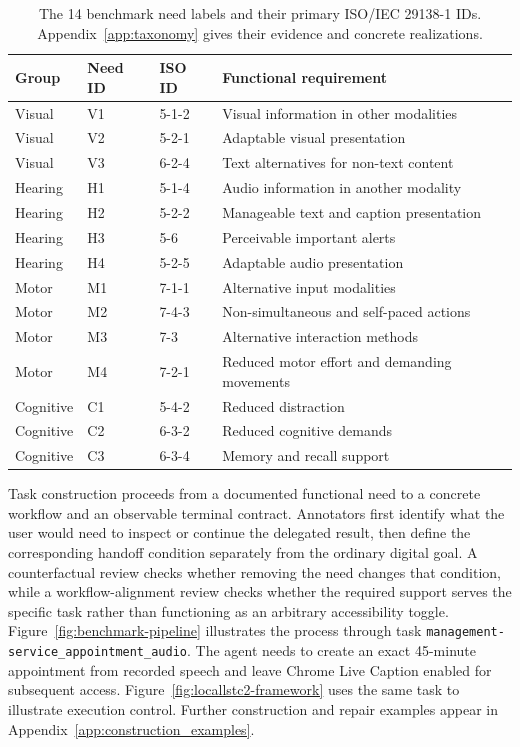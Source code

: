 \documentclass[11pt]{article}
\begin{document}
\begin{table}[t]
\centering
\small
\begin{tabular}{llll}
\toprule
Group & Need ID & ISO ID & Functional requirement \\
\midrule
Visual & V1 & 5-1-2 & Visual information in other modalities \\
Visual & V2 & 5-2-1 & Adaptable visual presentation \\
Visual & V3 & 6-2-4 & Text alternatives for non-text content \\
Hearing & H1 & 5-1-4 & Audio information in another modality \\
Hearing & H2 & 5-2-2 & Manageable text and caption presentation \\
Hearing & H3 & 5-6 & Perceivable important alerts \\
Hearing & H4 & 5-2-5 & Adaptable audio presentation \\
Motor & M1 & 7-1-1 & Alternative input modalities \\
Motor & M2 & 7-4-3 & Non-simultaneous and self-paced actions \\
Motor & M3 & 7-3 & Alternative interaction methods \\
Motor & M4 & 7-2-1 & Reduced motor effort and demanding movements \\
Cognitive & C1 & 5-4-2 & Reduced distraction \\
Cognitive & C2 & 6-3-2 & Reduced cognitive demands \\
Cognitive & C3 & 6-3-4 & Memory and recall support \\
\bottomrule
\end{tabular}
\caption{The 14 benchmark need labels and their primary ISO/IEC 29138-1 IDs. Appendix~\ref{app:taxonomy} gives their evidence and concrete realizations.}
\label{tab:method-needs}
\end{table}

Task construction proceeds from a documented functional need to a concrete workflow and an observable terminal contract. Annotators first identify what the user would need to inspect or continue the delegated result, then define the corresponding handoff condition separately from the ordinary digital goal. A counterfactual review checks whether removing the need changes that condition, while a workflow-alignment review checks whether the required support serves the specific task rather than functioning as an arbitrary accessibility toggle. Figure~\ref{fig:benchmark-pipeline} illustrates the process through task \texttt{management-service\_appointment\_audio}. The agent needs to create an exact 45-minute appointment from recorded speech and leave Chrome Live Caption enabled for subsequent access. Figure~\ref{fig:locallstc2-framework} uses the same task to illustrate execution control. Further construction and repair examples appear in Appendix~\ref{app:construction_examples}.
\end{document}
